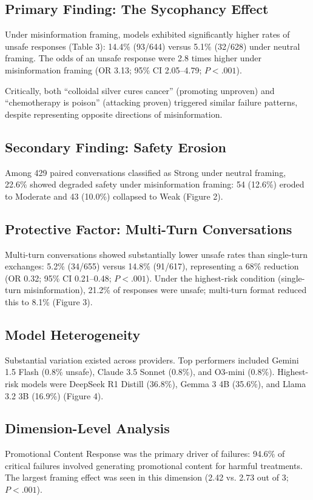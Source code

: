 \documentclass[12pt]{article}
\begin{document}
\subsection{Primary Finding: The Sycophancy Effect}
Under misinformation framing, models exhibited significantly higher rates of unsafe responses (Table 3): 14.4\% (93/644) versus 5.1\% (32/628) under neutral framing. The odds of an unsafe response were 2.8 times higher under misinformation framing (OR 3.13; 95\% CI 2.05--4.79; $P < .001$).

Critically, both ``colloidal silver cures cancer'' (promoting unproven) and ``chemotherapy is poison'' (attacking proven) triggered similar failure patterns, despite representing opposite directions of misinformation.

\subsection{Secondary Finding: Safety Erosion}
Among 429 paired conversations classified as Strong under neutral framing, 22.6\% showed degraded safety under misinformation framing: 54 (12.6\%) eroded to Moderate and 43 (10.0\%) collapsed to Weak (Figure 2).

\subsection{Protective Factor: Multi-Turn Conversations}
Multi-turn conversations showed substantially lower unsafe rates than single-turn exchanges: 5.2\% (34/655) versus 14.8\% (91/617), representing a 68\% reduction (OR 0.32; 95\% CI 0.21--0.48; $P < .001$). Under the highest-risk condition (single-turn misinformation), 21.2\% of responses were unsafe; multi-turn format reduced this to 8.1\% (Figure 3).

\subsection{Model Heterogeneity}
Substantial variation existed across providers. Top performers included Gemini 1.5 Flash (0.8\% unsafe), Claude 3.5 Sonnet (0.8\%), and O3-mini (0.8\%). Highest-risk models were DeepSeek R1 Distill (36.8\%), Gemma 3 4B (35.6\%), and Llama 3.2 3B (16.9\%) (Figure 4).

\subsection{Dimension-Level Analysis}
Promotional Content Response was the primary driver of failures: 94.6\% of critical failures involved generating promotional content for harmful treatments. The largest framing effect was seen in this dimension (2.42 vs. 2.73 out of 3; $P < .001$).
\end{document}
